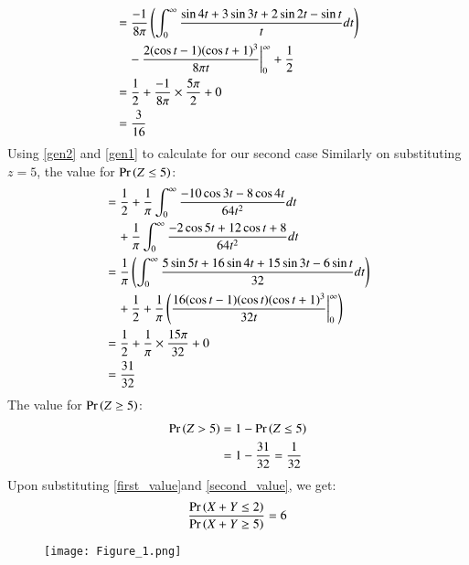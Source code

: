 \documentclass[journal,12pt,twocolumn]{IEEEtran}
\begin{document}
\begin{align}
    &=\frac{-1}{8\pi}\left(\int_0^\infty\frac{\sin{4t}+3\sin{3t}+2\sin{2t}-\sin{t}}{t}dt\right)\\
    &\quad -\frac{2(\cos{t}-1)(\cos{t}+1)^3}{8\pi t}\bigg|_0^\infty+\frac{1}{2}\\
    &=\frac{1}{2} + \frac{-1}{8\pi}\times \frac{5\pi}{2}+0\\
    &=\frac{3}{16}\label{first_value}
\end{align}
Using \eqref{gen2} and \eqref{gen1} to calculate for our second case
Similarly on substituting $z=5$, the value for $\Pr\left(Z\leq 5\right)$:
\begin{align}
\nonumber
    &=\frac{1}{2} +\frac{1}{\pi}\int_0^\infty\frac{-10\cos{3t}-8\cos{4t}}{64t^2}dt\\&\quad +\frac{1}{\pi}\int_0^\infty\frac{-2\cos{5t}+12\cos{t}+8}{64t^2}dt\\ \nonumber
    &=\frac{1}{\pi}\left(\int_0^\infty\frac{5\sin{5t}+16\sin{4t}+15\sin{3t}-6\sin{t}}{32}dt\right)\\
    &\quad+\frac{1}{2}+\frac{1}{\pi}\left(\frac{16(\cos{t}-1)(\cos{t})(\cos{t}+1)^3}{32t}\bigg|_0^\infty\right)\\
    &=\frac{1}{2}+\frac{1}{\pi}\times\frac{15\pi}{32} + 0\\
    &=\frac{31}{32}
\end{align}
The value for $\Pr\left(Z\geq 5\right)$:
\begin{align}
    \Pr\left(Z>5\right)&=1-\Pr\left(Z\leq 5\right)\\
    &=1-\frac{31}{32}=\frac{1}{32}\label{second_value}
\end{align}
Upon substituting \eqref{first_value}and \eqref{second_value}, we get:
\begin{align}
    \frac{\Pr\left(X+Y \leq 2\right)}{\Pr\left(X+Y \geq 5\right)} = 6
\end{align}
\begin{figure}[h]
    \centering
    \texttt{[image: Figure\_1.png]}
    \caption{}
    \label{fig:my_label}
\end{figure}
\end{document}
